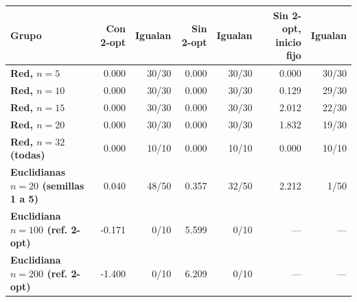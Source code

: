 \renewcommand{\arraystretch}{1.2}
\begin{tabular}{|l|r|r|r|r|r|r|}
\hline
\rowcolor{gray!20} \textbf{Grupo} & \textbf{Con 2-opt} & \textbf{Igualan} & \textbf{Sin 2-opt} & \textbf{Igualan} & \textbf{Sin 2-opt, inicio fijo} & \textbf{Igualan} \\
\hline
\textbf{Red, $n=5$} & 0.000 & 30/30 & 0.000 & 30/30 & 0.000 & 30/30 \\
\hline
\textbf{Red, $n=10$} & 0.000 & 30/30 & 0.000 & 30/30 & 0.129 & 29/30 \\
\hline
\textbf{Red, $n=15$} & 0.000 & 30/30 & 0.000 & 30/30 & 2.012 & 22/30 \\
\hline
\textbf{Red, $n=20$} & 0.000 & 30/30 & 0.000 & 30/30 & 1.832 & 19/30 \\
\hline
\textbf{Red, $n=32$ (todas)} & 0.000 & 10/10 & 0.000 & 10/10 & 0.000 & 10/10 \\
\hline
\textbf{Euclidianas $n=20$ (semillas 1 a 5)} & 0.040 & 48/50 & 0.357 & 32/50 & 2.212 & 1/50 \\
\hline
\textbf{Euclidiana $n=100$ (ref. 2-opt)} & -0.171 & 0/10 & 5.599 & 0/10 & --- & --- \\
\hline
\textbf{Euclidiana $n=200$ (ref. 2-opt)} & -1.400 & 0/10 & 6.209 & 0/10 & --- & --- \\
\hline
\end{tabular}
